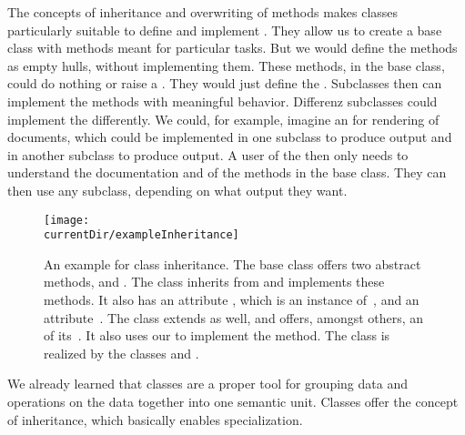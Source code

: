 The concepts of inheritance and overwriting of methods makes classes particularly suitable to define and implement .
They allow us to create a base class with methods meant for particular tasks.
But we would define the methods as empty hulls, without implementing them.
These methods, in the base class, could do nothing or raise a .
They would just define the .
Subclasses then can implement the methods with meaningful behavior.
Differenz subclasses could implement the  differently.
We could, for example, imagine an  for rendering of documents, which could be implemented in one subclass to produce  output and in another subclass to produce  output.
A user of the  then only needs to understand the documentation and  of the methods in the base class.
They can then use any subclass, depending on what output they want.%
%
%
%
\begin{figure}[tb]%
\centering%
\texttt{[image: \\currentDir/exampleInheritance]}%
\caption{An example for class inheritance. %
The base class  offers two abstract methods,  and . %
The class  inherits from  and implements these methods. %
It also has an attribute , which is an instance of~, and an attribute~. %
The class  extends  as well, and offers, amongst others, an  of its~. %
It also uses our  to implement the  method. %
The class  is realized by the classes  and .}%
\label{fig:exampleInheritance}%
\end{figure}%
%
%
%
%
%
%
%
%
%
%
%
%
%
%
%
%
%
%
%
%
We already learned that classes are a proper tool for grouping data and operations on the data together into one semantic unit.
Classes offer the concept of inheritance, which basically enables specialization.

